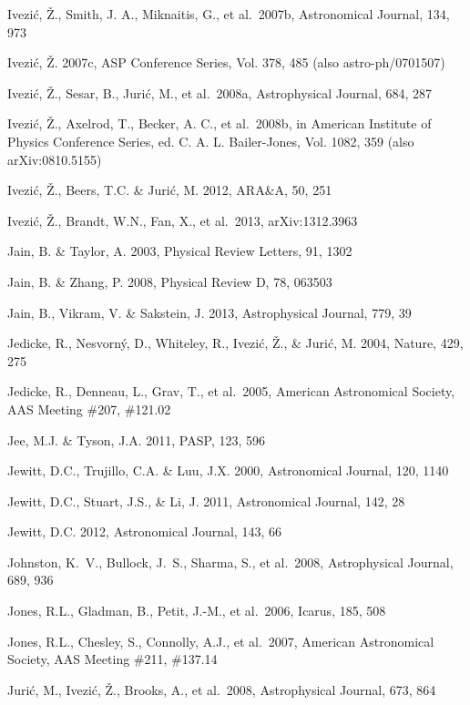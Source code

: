 \documentclass{emulateapj}
\begin{document}
\begin{thebibliography}{}
\bibitem[()]{} Ivezi\'{c}, \v{Z}., Smith, J. A., Miknaitis, G., et al.~2007b, Astronomical Journal, 134, 973

\bibitem[()]{} Ivezi\'{c}, \v{Z}. 2007c, ASP Conference Series, Vol. 378, 485 (also astro-ph/0701507)

\bibitem[()]{} Ivezi\'c, \v Z., Sesar, B., Juri\'{c}, M., et al.~2008a, Astrophysical Journal, 684, 287

\bibitem[()]{} Ivezi\'c, \v Z., Axelrod, T., Becker, A. C., et al.~2008b, in American Institute of
                           Physics Conference Series, ed. C. A. L. Bailer-Jones, Vol. 1082, 359 (also arXiv:0810.5155)

\bibitem[()]{} Ivezi\'c, \v Z., Beers, T.C. \& Juri\'{c}, M. 2012, ARA\&A, 50, 251

\bibitem[()]{} Ivezi\'c, \v Z., Brandt, W.N., Fan, X., et al.~2013, arXiv:1312.3963

\bibitem[()]{} Jain, B. \& Taylor, A. 2003, Physical Review Letters, 91, 1302	

\bibitem[()]{} Jain, B. \& Zhang, P. 2008, Physical Review D, 78, 063503 
 
\bibitem[()]{} Jain, B., Vikram, V. \& Sakstein, J. 2013, Astrophysical Journal, 779, 39

\bibitem[()]{} Jedicke, R., Nesvorn{\'y}, D., Whiteley, R., Ivezi{\'c}, {\v Z}., \& Juri{\'c}, M. 2004, 
             Nature, 429, 275 

\bibitem[()]{} Jedicke, R., Denneau, L., Grav, T., et al.~2005, American Astronomical Society, AAS 
             Meeting \#207, \#121.02

\bibitem[()]{} Jee, M.J. \& Tyson, J.A. 2011, PASP, 123, 596

\bibitem[()]{} Jewitt, D.C., Trujillo, C.A. \& Luu, J.X. 2000, Astronomical Journal, 120, 1140

\bibitem[()]{} Jewitt, D.C., Stuart, J.S., \& Li, J. 2011, Astronomical Journal, 142, 28 

\bibitem[()]{} Jewitt, D.C. 2012, Astronomical Journal, 143, 66

\bibitem[()]{} Johnston, K.~V., Bullock, J.~S., Sharma, S., et al.~2008, Astrophysical Journal, 689, 936

\bibitem[()]{} Jones, R.L., Gladman, B., Petit, J.-M., et al.~2006, Icarus, 185, 508

\bibitem[()]{} Jones, R.L., Chesley, S., Connolly, A.J., et al.~2007, American Astronomical Society, AAS 
             Meeting \#211, \#137.14

\bibitem[()]{} Juri\'{c}, M., Ivezi\'c, \v Z., Brooks, A., et al.~2008, Astrophysical Journal, 673, 864


\end{thebibliography}
\end{document}
